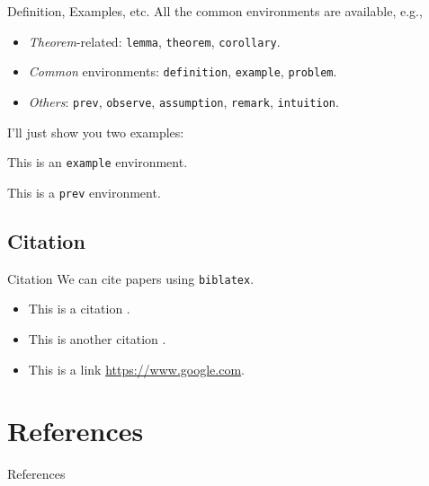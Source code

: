 \documentclass[aspectratio=169, xcolor={dvipsnames}, hyperref={colorlinks=true,linkcolor=themecolor, urlcolor=magenta,citecolor=violet, hyperfootnotes=true}]{beamer}
\begin{document}
\begin{frame}{Definition, Examples, etc.}
    All the common environments are available, e.g.,
    \begin{itemize}
        \item \emph{Theorem}-related: \texttt{lemma}, \texttt{theorem}, \texttt{corollary}.
        \item \emph{Common} environments: \texttt{definition}, \texttt{example}, \texttt{problem}.
        \item \emph{Others}: \texttt{prev}, \texttt{observe}, \texttt{assumption}, \texttt{remark}, \texttt{intuition}.
    \end{itemize}

    I'll just show you two examples:

    \begin{example}[A demonstration]
        This is an \texttt{example} environment.
    \end{example}

    \begin{prev}
        This is a \texttt{prev} environment.
    \end{prev}
\end{frame}

\subsection{Citation}
\begin{frame}{Citation}
    We can cite papers using \texttt{biblatex}.
    \begin{itemize}
        \item This is a citation \cite{smith2025example}.
        \item This is another citation \cite{johnson2024innovative, lee2023computational}.
        \item This is a link \url{https://www.google.com}.
    \end{itemize}
\end{frame}

\section{References}

\begin{frame}{References}
    \printbibliography
\end{frame}
\end{document}
